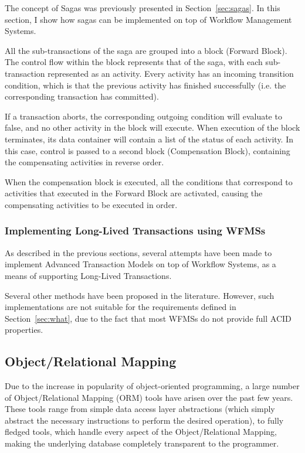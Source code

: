 \documentclass{llncs}
\begin{document}
The concept of Sagas was previously presented in
Section~\ref{sec:sagas}. In this section, I show how sagas can be
implemented on top of Workflow Management Systems.

All the sub-transactions of the saga are grouped into a block (Forward
Block). The control flow within the block represents that of the saga,
with each sub-transaction represented as an activity. Every activity
has an incoming transition condition, which is that the previous
activity has finished successfully (i.e. the corresponding transaction
has committed).

If a transaction aborts, the corresponding outgoing condition will
evaluate to false, and no other activity in the block will
execute. When execution of the block terminates, its data container
will contain a list of the status of each activity. In this case,
control is passed to a second block (Compensation Block), containing
the compensating activities in reverse order.

When the compensation block is executed, all the conditions that
correspond to activities that executed in the Forward Block are
activated, causing the compensating activities to be executed in
order.

\subsubsection{Implementing Long-Lived Transactions using WFMSs}

As described in the previous sections, several attempts have been made
to implement Advanced Transaction Models on top of Workflow Systems,
as a means of supporting Long-Lived Transactions.

Several other methods have been proposed in the
literature\cite{798492, alonso1996advanced}. However, such
implementations are not suitable for the requirements defined in
Section~\ref{sec:what}, due to the fact that most WFMSs do not provide
full ACID properties.

\subsection{Object/Relational Mapping}

Due to the increase in popularity of object-oriented programming, a
large number of Object/Relational Mapping (ORM) tools have arisen over
the past few years\cite{orm}. These tools range from simple data
access layer abstractions (which simply abstract the necessary
instructions to perform the desired operation), to fully fledged
tools, which handle every aspect of the Object/Relational Mapping,
making the underlying database completely transparent to the
programmer.
\end{document}
